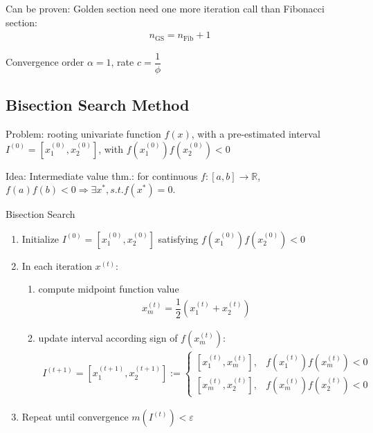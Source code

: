     Can be proven: Golden section need one more iteration call than Fibonacci section:
    \begin{align}
        n_\mathrm{GS}=n_\mathrm{Fib}+1 
    \end{align}

    Convergence order $ \alpha =1 $, rate $ c=\dfrac{1}{\phi } $


 
\subsection{Bisection Search Method}
    \hypertarget{Bisection}{Problem}: rooting univariate function $ f(x) $, with a pre-­estimated interval $ I^{(0)}=[x_1^{(0)},x_2^{(0)}] $, with $ f(x_1^{(0)})f(x_2^{(0)})<0 $

    Idea: Intermediate value thm.: for continuous $ f:[a,b]\to \mathbb{R}  $, $ f(a)f(b)<0\Rightarrow \exists x^*, s.t. f(x^*)=0 $. 

\begin{algorithm}{Bisection Search}
    
\begin{enumerate}[topsep=2pt,itemsep=2pt]
    \item Initialize $ I^{(0)}=[x_1^{(0)},x_2^{(0)}] $ satisfying $ f(x_1^{(0)})f(x_2^{(0)})<0 $
    \item In each iteration $ x^{(t)} $:
    \begin{enumerate}[topsep=2pt,itemsep=2pt]
        \item compute midpoint function value
    \begin{align}
        x_m^{(t)}=\dfrac{1}{2}\left(x_1^{(t)}+x_2^{(t)}\right) 
    \end{align}
        \item update interval according sign of $ f(x_m^{(t)}) $:
    \begin{align}
        I^{(t+1)}=[x_1^{(t+1)},x_2^{(t+1)}]:=\begin{cases}
            [x_1^{(t)},x_m^{(t)}],& f(x_1^{(t)})f(x_m^{(t)})<0\\
            [x_m^{(t)},x_2^{(t)}],& f(x_m^{(t)})f(x_2^{(t)})<0
        \end{cases} 
    \end{align}
    \end{enumerate}

    \item Repeat until convergence $ m(I^{(t)})<\varepsilon  $
\end{enumerate}
\end{algorithm}
    



